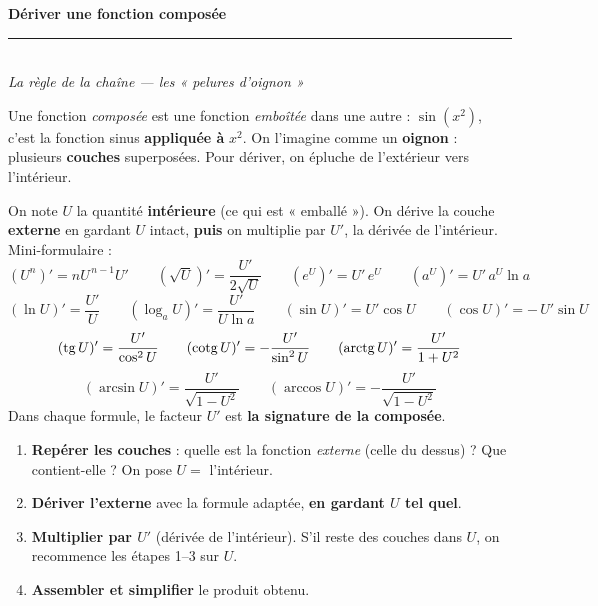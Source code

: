 \pagestyle{fancy}\fancyhf{}
\fancyfoot[C]{\small\thepage}
\renewcommand{\headrulewidth}{0.8pt}



\begin{center}
{\LARGE\bfseries\color{primarydark} Dériver une fonction composée}\\[2pt]
{\color{primary}\rule{0.5\textwidth}{1.2pt}}\\[4pt]
{\small\itshape La règle de la chaîne — les « pelures d'oignon »}
\end{center}
\vspace{2mm}

Une fonction \emph{composée} est une fonction \emph{emboîtée} dans une autre : $\sin(x^2)$, c'est
la fonction sinus \textbf{appliquée à} $x^2$. On l'imagine comme un \textbf{oignon} : plusieurs
\textbf{couches} superposées. Pour dériver, on épluche de l'extérieur vers l'intérieur.

\begin{cle}
On note $U$ la quantité \textbf{intérieure} (ce qui est « emballé »). On dérive la couche
\textbf{externe} en gardant $U$ intact, \textbf{puis} on multiplie par $U'$, la dérivée de l'intérieur.
Mini-formulaire :
\[
(U^n)'=nU^{\,n-1}U' \qquad (\sqrt{U})'=\frac{U'}{2\sqrt U} \qquad (e^{U})'=U'\,e^{U}
\qquad (a^{U})'=U'\,a^{U}\ln a
\]
\[
(\ln U)'=\frac{U'}{U} \qquad (\log_a U)'=\frac{U'}{U\ln a} \qquad
(\sin U)'=U'\cos U \qquad (\cos U)'=-\,U'\sin U
\]
\[
(\operatorname{tg} U)'=\frac{U'}{\cos^2 U} \qquad (\operatorname{cotg} U)'=-\frac{U'}{\sin^2 U} \qquad
(\operatorname{arctg} U)'=\frac{U'}{1+U^2}
\]
\[
(\arcsin U)'=\frac{U'}{\sqrt{1-U^2}} \qquad (\arccos U)'=-\frac{U'}{\sqrt{1-U^2}}
\]
Dans chaque formule, le facteur $U'$ est \textbf{la signature de la composée}.
\end{cle}

\begin{methode}
\begin{enumerate}[leftmargin=6mm,itemsep=1pt]
\item \textbf{Repérer les couches} : quelle est la fonction \emph{externe} (celle du dessus) ?
      Que contient-elle ? On pose $U=$ l'intérieur.
\item \textbf{Dériver l'externe} avec la formule adaptée, \textbf{en gardant $U$ tel quel}.
\item \textbf{Multiplier par $U'$} (dérivée de l'intérieur). S'il reste des couches dans $U$,
      on recommence les étapes 1--3 sur $U$.
\item \textbf{Assembler et simplifier} le produit obtenu.
\end{enumerate}
\end{methode}

